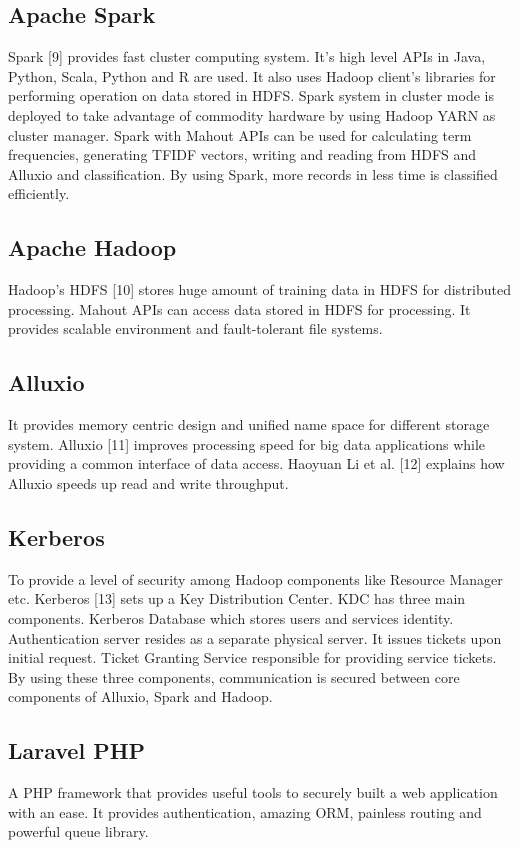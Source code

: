 \documentclass[oneside,a4paper,12pt]{pictreport}
\begin{document}
\subsection{Apache Spark} 
Spark [9] provides fast cluster computing system. It's high level APIs in Java, Python, Scala, Python and R are used. It also uses Hadoop client's libraries for performing operation on data stored in HDFS. Spark system in cluster mode is deployed to take advantage of commodity hardware by using Hadoop YARN as cluster manager. Spark with Mahout APIs can be used for calculating term frequencies, generating TFIDF vectors, writing and reading from HDFS and Alluxio and classification. By using Spark, more records in less time is classified efficiently.

\subsection{Apache Hadoop}
Hadoop's HDFS [10] stores huge amount of training data in HDFS for distributed processing. Mahout APIs can access data stored in HDFS for processing. It provides scalable environment and fault-tolerant file systems.

\subsection{Alluxio}
It provides memory centric design and unified name space for different storage system. Alluxio [11] improves processing speed for big data applications while providing a common interface of data access. Haoyuan Li et al. [12] explains how Alluxio speeds up read and write throughput. 

\subsection{Kerberos}
To provide a level of security among Hadoop components like Resource Manager etc. Kerberos [13] sets up a Key Distribution Center. KDC has three main components. Kerberos Database which stores users and services identity. Authentication server resides as a separate physical server. It issues tickets upon initial request. Ticket Granting Service responsible for providing service tickets. By using these three components, communication is secured between core components of Alluxio, Spark and Hadoop.

\subsection{Laravel PHP}
A PHP framework that provides useful tools to securely built a web application with an ease. It provides authentication, amazing ORM, painless routing and powerful queue library.
\end{document}
